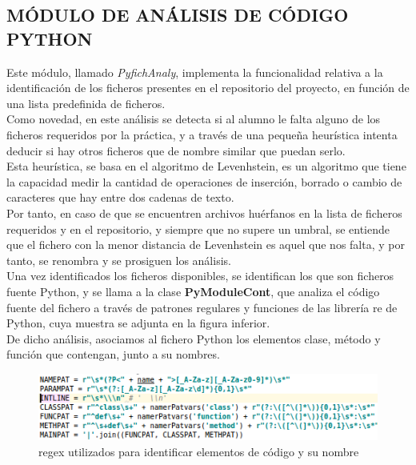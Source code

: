 \subsection{MÓDULO DE ANÁLISIS DE CÓDIGO PYTHON}

Este módulo, llamado \textit{PyfichAnaly}, implementa la funcionalidad relativa a la identificación de los ficheros presentes en el repositorio del proyecto, en función de una lista predefinida de ficheros.\\


Como novedad, en este análisis se detecta si al alumno le falta alguno de los ficheros requeridos por la práctica, y a través de una pequeña heurística intenta deducir si hay otros ficheros que de nombre similar que puedan serlo.\\


Esta heurística, se basa en el algoritmo de Levenhstein, es un algoritmo que tiene la capacidad medir la cantidad de operaciones de inserción, borrado o cambio de caracteres que hay entre dos cadenas de texto.\\


Por tanto, en caso de que se encuentren archivos huérfanos en la lista de ficheros requeridos y en el repositorio, y siempre que no supere un umbral, se entiende que el fichero con la menor distancia de Levenhstein es aquel que nos falta, y por tanto, se renombra y se prosiguen los análisis.\\


Una vez identificados los ficheros disponibles, se identifican los que son ficheros fuente Python, y se llama a la clase \textbf{PyModuleCont}, que analiza el código fuente del fichero a través de patrones regulares y funciones de las librería re de Python, cuya muestra se adjunta en la figura inferior.\\


De dicho análisis, asociamos al fichero Python los elementos clase, método y función que contengan, junto a su nombres.\\


\begin{figure}[H]
   \centering
   \includegraphics[width=16cm]{img/Selection_022_pyanaly_regex}
   \caption{regex utilizados para identificar elementos de código y su nombre}
   \label{figura:regex}
\end{figure}

